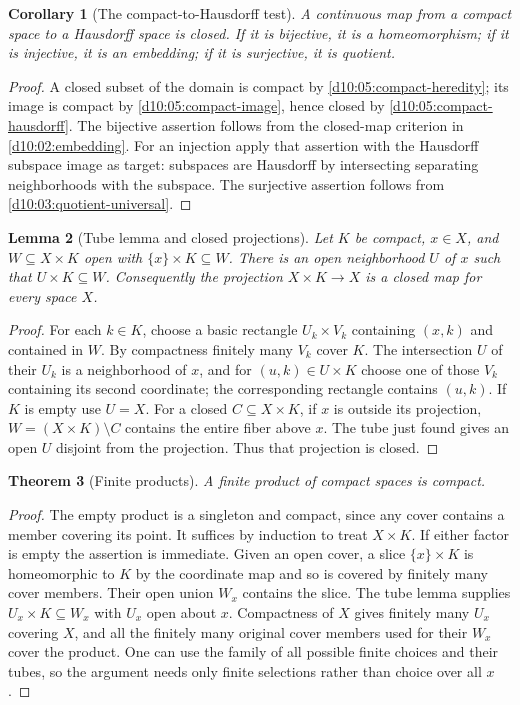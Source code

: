 \documentclass[11pt,oneside,openany]{book}
\newtheorem{theorem}{Theorem}[chapter]
\newtheorem{lemma}[theorem]{Lemma}
\newtheorem{corollary}[theorem]{Corollary}
\theoremstyle{definition}
\theoremstyle{remark}
\begin{document}
\begin{corollary}[The compact-to-Hausdorff test]\label{d10:05:compact-bijection}
A continuous map from a compact space to a Hausdorff space is closed. If it is bijective, it is a homeomorphism; if it is injective, it is an embedding; if it is surjective, it is quotient.
\end{corollary}
\begin{proof}
A closed subset of the domain is compact by \cref{d10:05:compact-heredity}; its image is compact by \cref{d10:05:compact-image}, hence closed by \cref{d10:05:compact-hausdorff}. The bijective assertion follows from the closed-map criterion in \cref{d10:02:embedding}. For an injection apply that assertion with the Hausdorff subspace image as target: subspaces are Hausdorff by intersecting separating neighborhoods with the subspace. The surjective assertion follows from \cref{d10:03:quotient-universal}.
\end{proof}

\begin{lemma}[Tube lemma and closed projections]\label{d10:05:tube}
Let $K$ be compact, $x\in X$, and $W\subseteq X\times K$ open with $\{x\}\times K\subseteq W$. There is an open neighborhood $U$ of $x$ such that $U\times K\subseteq W$. Consequently the projection $X\times K\to X$ is a closed map for every space $X$.
\end{lemma}
\begin{proof}
For each $k\in K$, choose a basic rectangle $U_k\times V_k$ containing $(x,k)$ and contained in $W$. By compactness finitely many $V_k$ cover $K$. The intersection $U$ of their $U_k$ is a neighborhood of $x$, and for $(u,k)\in U\times K$ choose one of those $V_k$ containing its second coordinate; the corresponding rectangle contains $(u,k)$. If $K$ is empty use $U=X$. For a closed $C\subseteq X\times K$, if $x$ is outside its projection, $W=(X\times K)\setminus C$ contains the entire fiber above $x$. The tube just found gives an open $U$ disjoint from the projection. Thus that projection is closed.
\end{proof}

\begin{theorem}[Finite products]\label{d10:05:finite-product}
A finite product of compact spaces is compact.
\end{theorem}
\begin{proof}
The empty product is a singleton and compact, since any cover contains a member covering its point. It suffices by induction to treat $X\times K$. If either factor is empty the assertion is immediate. Given an open cover, a slice $\{x\}\times K$ is homeomorphic to $K$ by the coordinate map and so is covered by finitely many cover members. Their open union $W_x$ contains the slice. The tube lemma supplies $U_x\times K\subseteq W_x$ with $U_x$ open about $x$. Compactness of $X$ gives finitely many $U_x$ covering $X$, and all the finitely many original cover members used for their $W_x$ cover the product. One can use the family of all possible finite choices and their tubes, so the argument needs only finite selections rather than choice over all $x$.
\end{proof}
\end{document}
